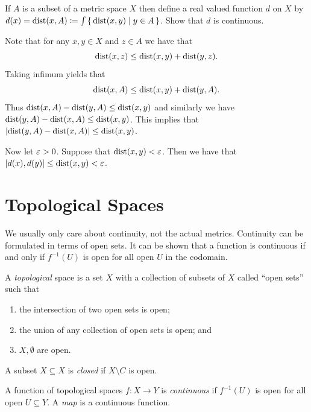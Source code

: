 \documentclass[letterpaper, 11pt]{article}
\begin{document}
\begin{exercise}
  If $A$ is a subset of a metric space $X$ then define a real valued function $d$ on $X$ by $d(x) = \operatorname{dist}(x, A) \coloneqq \int\set{\operatorname{dist}(x, y) | y \in A}$.
  Show that $d$ is continuous.
\end{exercise}
\begin{pf}
  Note that for any $x, y \in X$ and $z \in A$ we have that
  \[
    \operatorname{dist}(x, z) \leq \operatorname{dist}(x, y) + \operatorname{dist}(y, z).
  \]
  Taking infimum yields that
  \[
    \operatorname{dist}(x, A) \leq \operatorname{dist}(x, y) + \operatorname{dist}(y, A).
  \]
  Thus $\operatorname{dist}(x, A) - \operatorname{dist}(y, A) \leq \operatorname{dist}(x, y)$ and similarly we have $\operatorname{dist}(y, A) - \operatorname{dist}(x, A) \leq \operatorname{dist}(x, y)$.
  This implies that $\abs{\operatorname{dist}(y, A) - \operatorname{dist}(x, A)} \leq \operatorname{dist}(x, y)$.

  Now let $\varepsilon > 0$.
  Suppose that $\operatorname{dist}(x, y) < \varepsilon$.
  Then we have that $\abs{d(x), d(y)} \leq \operatorname{dist}(x, y) < \varepsilon$.
\end{pf}

\clearpage

\section{Topological Spaces}

We usually only care about continuity, not the actual metrics.
Continuity can be formulated in terms of open sets.
It can be shown that a function is continuous if and only if $f^{-1}(U)$ is open for all open $U$ in the codomain.

\begin{defn}
  A \emph{topological} space is a set $X$ with a collection of subsets of $X$ called ``open sets'' such that
  \begin{enumerate}
  \item the intersection of two open sets is open;
  \item the union of any collection of open sets is open; and
  \item $X, \emptyset$ are open.
  \end{enumerate}
  A subset $X \subseteq X$ is \emph{closed} if $X \setminus C$ is open.
\end{defn}

\begin{defn}
  A function of topological spaces $f\colon X \to Y$ is \emph{continuous} if $f^{-1}(U)$ is open for all open $U \subseteq Y$.
  A \emph{map} is a continuous function.
\end{defn}
\end{document}
